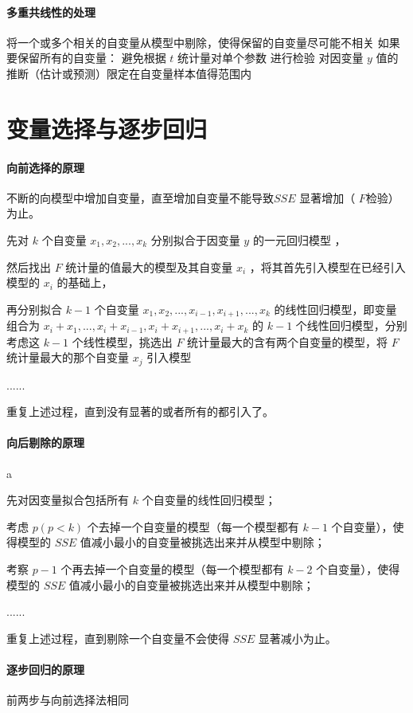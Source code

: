 \documentclass[UTF8,10pt]{book}
\begin{document}
\paragraph{多重共线性的处理}	将一个或多个相关的自变量从模型中剔除，使得保留的自变量尽可能不相关 如果要保留所有的自变量： 避免根据 $t$ 统计量对单个参数 进行检验 对因变量 $y$ 值的推断（估计或预测）限定在自变量样本值得范围内

\section{变量选择与逐步回归}

\paragraph{向前选择的原理}	不断的向模型中增加自变量，直至增加自变量不能导致 ​$SSE$ 显著增加（ $F$​ 检验）为止。 

先对 $k$ 个自变量 $ x_1,x_2,...,x_k$ 分别拟合于因变量 $y$ 的一元回归模型 ，

然后找出 $F$ 统计量的值最大的模型及其自变量 $x_i$ ，将其首先引入模型在已经引入模型的 $x_i$ 的基础上，

再分别拟合 $k-1$ 个自变量 $ x_1,x_2,...,x_{i-1},x_{i+1},...,x_{k}$ 的线性回归模型，即变量组合为 $x_i + x_1,...,x_i + x_{i-1},x_i + x_{i+1},...,x_i + x_{k}$ 的 $k-1$ 个线性回归模型，分别考虑这 $k-1$ 个线性模型，挑选出 $F$ 统计量最大的含有两个自变量的模型，将 $F$ 统计量最大的那个自变量 $x_j $ 引入模型

......

重复上述过程，直到没有显著的或者所有的都引入了。

\paragraph{向后剔除的原理}	a

先对因变量拟合包括所有 $k$ 个自变量的线性回归模型；

考虑 $p(p<k)$ 个去掉一个自变量的模型（每一个模型都有 $k-1$ 个自变量），使得模型的 $SSE$ 值减小最小的自变量被挑选出来并从模型中剔除；

考察 $p-1$ 个再去掉一个自变量的模型（每一个模型都有 $k-2$ 个自变量），使得模型的 $SSE$ 值减小最小的自变量被挑选出来并从模型中剔除；

......

重复上述过程，直到剔除一个自变量不会使得 $SSE$ 显著减小为止。

\paragraph{逐步回归的原理}	前两步与向前选择法相同
\end{document}
